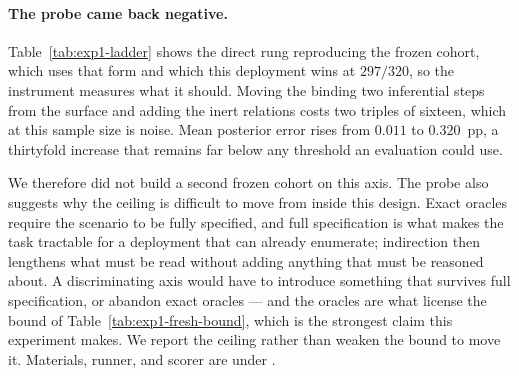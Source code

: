\begin{center}
\begin{minipage}{\linewidth}
\centering
{}
\label{tab:exp1-ladder}
\small

\end{minipage}
\end{center}

\paragraph{The probe came back negative.} Table~\ref{tab:exp1-ladder} shows the
direct rung reproducing the frozen cohort, which uses that form and which this
deployment wins at $297/320$, so the instrument measures what it should. Moving
the binding two inferential steps from the surface and adding the inert relations
costs two triples of sixteen, which at this sample size is noise. Mean posterior
error rises from $0.011$ to $0.320$~pp, a thirtyfold increase that remains far
below any threshold an evaluation could use.

We therefore did not build a second frozen cohort on this axis. The probe also
suggests why the ceiling is difficult to move from inside this design. Exact
oracles require the scenario to be fully specified, and full specification is
what makes the task tractable for a deployment that can already enumerate;
indirection then lengthens what must be read without adding anything that must be
reasoned about. A discriminating axis would have to introduce something that
survives full specification, or abandon exact oracles --- and the oracles are what
license the bound of Table~\ref{tab:exp1-fresh-bound}, which is the strongest
claim this experiment makes. We report the ceiling rather than weaken the bound
to move it. Materials, runner, and scorer are under
.


